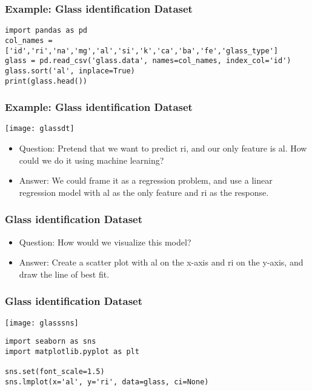 \begin{frame}[fragile]\frametitle{Example: Glass identification Dataset}
\begin{lstlisting}
import pandas as pd
col_names = ['id','ri','na','mg','al','si','k','ca','ba','fe','glass_type']
glass = pd.read_csv('glass.data', names=col_names, index_col='id')
glass.sort('al', inplace=True)
print(glass.head())
\end{lstlisting}
\end{frame}

\begin{frame}[fragile]\frametitle{Example: Glass identification Dataset}
\begin{center}
\texttt{[image: glassdt]}
\end{center}
\begin{itemize}
\item Question: Pretend that we want to predict ri, and our only feature is al. How could we do it using machine learning?
\item Answer: We could frame it as a regression problem, and use a linear regression model with al as the only feature and ri as the response.
\end{itemize}
\end{frame}

\begin{frame}[fragile]\frametitle{Glass identification Dataset}
\begin{itemize}
\item Question: How would we visualize this model?
\item Answer: Create a scatter plot with al on the x-axis and ri on the y-axis, and draw the line of best fit.
\end{itemize}
\end{frame}

\begin{frame}[fragile]\frametitle{Glass identification Dataset}
\begin{center}
\texttt{[image: glasssns]}
\end{center}

\begin{lstlisting}
import seaborn as sns
import matplotlib.pyplot as plt

sns.set(font_scale=1.5)
sns.lmplot(x='al', y='ri', data=glass, ci=None)
\end{lstlisting}

\end{frame}


